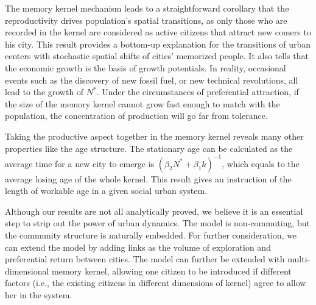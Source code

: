 \documentclass[reprint,unsortedaddress,amsmath,amssymb,aps,prl,showkeys]{revtex4-2}
\begin{document}
The memory kernel mechanism leads to a straightforward corollary that the reproductivity drives population's spatial transitions, as only those who are recorded in the kernel are considered as active citizens that attract new comers to his city. This result provides a bottom-up explanation for the transitions of urban centers with stochastic spatial shifts of cities' memorized people. It also tells that the economic growth is the basis of growth potentials. In reality, occasional events such as the discovery of new fossil fuel, or new technical revolutions, all lead to the growth of $N^*$. Under the circumstances of preferential attraction, if the size of the memory kernel cannot grow fast enough to match with the population, the concentration of production will go far from tolerance. 

Taking the productive aspect together in the memory kernel reveals many other properties like the age structure. The stationary age can be calculated as the average time for a new city to emerge is $(\beta_2 N^* + \beta_1 k)^{-1}$, which equals to the average losing age of the whole kernel. This result gives an instruction of the length of workable age in a given social urban system.

Although our results are not all analytically proved, we believe it is an essential step to strip out the power of urban dynamics. The model is non-commuting, but the community structure is naturally embedded. For further consideration, we can extend the model by adding links as the volume of exploration and preferential return between cities\cite{WANG2019121921}. The model can further be extended with multi-dimensional memory kernel, allowing one citizen to be introduced if different factors\cite{tokita2020social} (i.e., the existing citizens in different dimensions of kernel) agree to allow her in the system.




\end{document}
